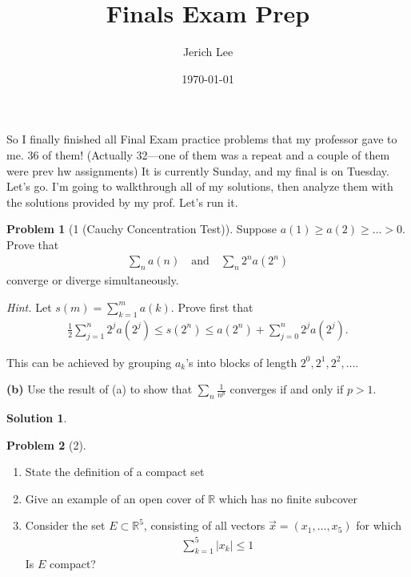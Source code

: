 \documentclass[12pt]{article}
\title{Finals Exam Prep}
\author{Jerich Lee}
\date{\today}
\theoremstyle{definition} %
\newtheorem{solution}{Solution}
\newtheorem{problem}{Problem}
\theoremstyle{plain} %
\begin{document}
\maketitle

So I finally finished all Final Exam practice problems that my professor gave to me. 36 of them! (Actually 32—one of them was a repeat and a couple of them were prev hw assignments) It is currently Sunday, and my final is on Tuesday. Let's go. I'm going to walkthrough all of my solutions, then analyze them with the solutions provided by my prof. Let's run it.
\begin{problem}[1 (Cauchy Concentration Test)]
    Suppose $a(1) \geq a(2) \geq \dots > 0$. Prove that
\begin{align}
\sum_{n} a(n) \quad \text{and} \quad \sum_{n} 2^n a(2^n)
\end{align}
converge or diverge simultaneously.

\textit{Hint.} Let $s(m) = \sum_{k=1}^m a(k)$. Prove first that
\begin{align}
\frac{1}{2} \sum_{j=1}^n 2^j a(2^j) \leq s(2^n) \leq a(2^n) + \sum_{j=0}^n 2^j a(2^j).
\end{align}

This can be achieved by grouping $a_k$'s into blocks of length $2^0, 2^1, 2^2, \dots$.

\noindent\textbf{(b)} Use the result of (a) to show that $\sum_n \frac{1}{n^p}$ converges if and only if $p > 1$.

\end{problem}
\begin{solution}
    
\end{solution}
\begin{problem}[2]
    \begin{enumerate}
       \item State the definition of a compact set
       \item Give an example of an open cover of $\mathbb{{R}}$ which has no finite subcover
       \item Consider the set $E \subset \mathbb{{R}}^{5}$, consisting of all vectors $\vec{x} =\left( x_1, \ldots, x_5  \right) $ for which  
       \begin{align}
        \sum_{k=1}^{5} \left\vert x_k \right\vert \leq 1
       \end{align}
       Is $E$ compact?
    \end{enumerate}

\end{problem}
\end{document}
